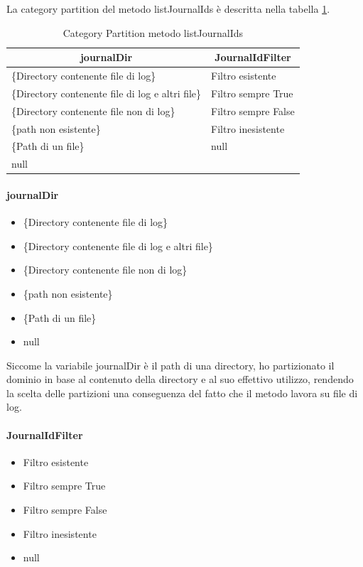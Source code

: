 \documentclass[12pt, a4paper]{article}
\begin{document}
La category partition del metodo listJournalIds è descritta nella tabella \ref{tab:categoryPartitionListJournalIds}.

\begin{table}[ht]
  \centering
  \caption[Journal: Category Partition]{Category Partition metodo listJournalIds}
  \begin{tabular}{|l|l|}
  \hline
  \multicolumn{1}{|c|}{journalDir} & \multicolumn{1}{|c|}{JournalIdFilter} \\
  \hline
  \{Directory contenente file di log\} & Filtro esistente \\
  \{Directory contenente file di log e altri file\} & Filtro sempre True \\
  \{Directory contenente file non di log\} & Filtro sempre False \\
  \{path non esistente\} & Filtro inesistente \\
  \{Path di un file\} & null \\
  null & \\
  \hline
  \end{tabular}
  \label{tab:categoryPartitionListJournalIds}
\end{table}

\paragraph{journalDir}
\begin{itemize}
  \item \{Directory contenente file di log\}
  \item \{Directory contenente file di log e altri file\}
  \item \{Directory contenente file non di log\}
  \item \{path non esistente\}
  \item \{Path di un file\}
  \item null
\end{itemize}
Siccome la variabile journalDir è il path di una directory, ho partizionato 
il dominio in base al contenuto della directory e al suo effettivo utilizzo, rendendo la scelta delle partizioni 
una conseguenza del fatto che il metodo lavora su file di log.

\paragraph{JournalIdFilter}
\begin{itemize}
    \item Filtro esistente
    \item Filtro sempre True
    \item Filtro sempre False
    \item Filtro inesistente
    \item null
\end{itemize}
\end{document}
